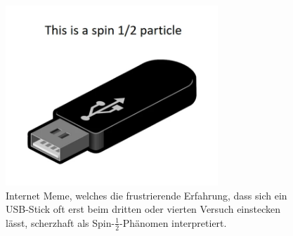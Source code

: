 %
%
%
\begin{figure}
\centering
\includegraphics[width=8cm]{chapters/010-fallstudie/images/spin12.png}
\caption{Internet Meme, welches die frustrierende Erfahrung, dass sich
ein USB-Stick oft erst beim dritten oder vierten Versuch einstecken
lässt, scherzhaft als Spin-$\frac12$-Phänomen interpretiert.
\label{buch:fallstudie:fig:spin12}}
\end{figure}
